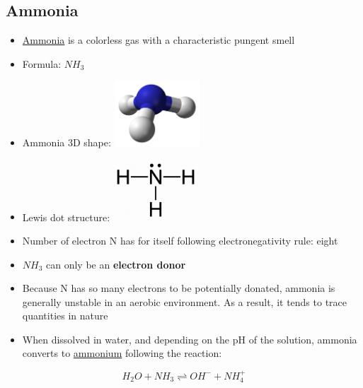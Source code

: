\documentclass[]{book}
\providecommand{\tightlist}{%
  \setlength{\itemsep}{0pt}\setlength{\parskip}{0pt}}
\theoremstyle{definition}
\theoremstyle{definition}
\theoremstyle{definition}
\theoremstyle{remark}
\begin{document}
\subsection{Ammonia}\label{ammonia}

\begin{itemize}
\tightlist
\item
  \href{https://en.wikipedia.org/wiki/Ammonia}{Ammonia} is a colorless
  gas with a characteristic pungent smell
\item
  Formula: \(NH_3\)
\item
  Ammonia 3D shape:
  \includegraphics[width=0.25000\textwidth]{pictures/Ammonia-3D-balls-A.png}
\item
  Lewis dot structure:
  \includegraphics[width=0.25000\textwidth]{pictures/ammonia-lewis-structure.jpg}
\item
  Number of electron N has for itself following electronegativity rule:
  eight
\item
  \(NH_3\) can only be an \textbf{electron donor}
\item
  Because N has so many electrons to be potentially donated, ammonia is
  generally unstable in an aerobic environment. As a result, it tends to
  trace quantities in nature
\item
  When dissolved in water, and depending on the pH of the solution,
  ammonia converts to \protect\hyperlink{NH4}{ammonium} following the
  reaction:
\end{itemize}

\[
H_2O + NH_3 \rightleftharpoons OH^{-} + NH_4^{+}
\]
\end{document}
